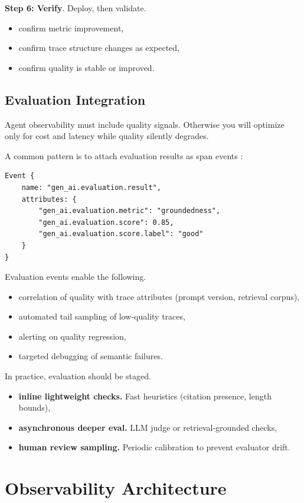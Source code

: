 \textbf{Step 6: Verify}. Deploy, then validate.
\begin{itemize}
\item confirm metric improvement,
\item confirm trace structure changes as expected,
\item confirm quality is stable or improved.
\end{itemize}

\subsection{Evaluation Integration}

Agent observability must include quality signals. Otherwise you will optimize only for cost and latency while quality silently degrades.

A common pattern is to attach evaluation results as span events \cite{otelgenai2025}:

\begin{verbatim}
Event {
    name: "gen_ai.evaluation.result",
    attributes: {
        "gen_ai.evaluation.metric": "groundedness",
        "gen_ai.evaluation.score": 0.85,
        "gen_ai.evaluation.score.label": "good"
    }
}
\end{verbatim}

Evaluation events enable the following.
\begin{itemize}
\item correlation of quality with trace attributes (prompt version, retrieval corpus),
\item automated tail sampling of low-quality traces,
\item alerting on quality regression,
\item targeted debugging of semantic failures.
\end{itemize}

In practice, evaluation should be staged.
\begin{itemize}
\item \textbf{inline lightweight checks.} Fast heuristics (citation presence, length bounds),
\item \textbf{asynchronous deeper eval.} LLM judge or retrieval-grounded checks,
\item \textbf{human review sampling.} Periodic calibration to prevent evaluator drift.
\end{itemize}

\section{Observability Architecture}

